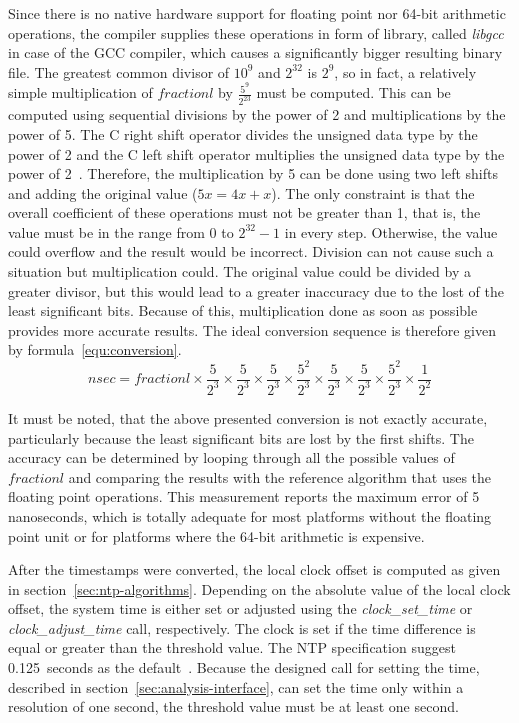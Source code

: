 Since there is no native hardware support for floating point nor 64-bit arithmetic operations,
the compiler supplies these operations in form of library, called {\it{libgcc}} in case of the GCC compiler,
which causes a significantly bigger resulting binary file.
The greatest common divisor of $10^9$ and $2^{32}$ is $2^9$,
so in fact, a relatively simple multiplication of $fractionl$ by $\frac{5^9}{2^{23}}$ must be computed.
This can be computed using sequential divisions by the power of 2 and multiplications by the power of 5.
The C right shift operator divides the unsigned data type by the power of 2
and the C left shift operator multiplies the unsigned data type by the power of 2~\cite{c99}.
Therefore, the multiplication by 5 can be done using two left shifts and
adding the original value ($5x = 4x + x$).
The only constraint is that the overall coefficient of these operations must not be greater than 1,
that is, the value must be in the range from $0$ to $2^{32}-1$ in every step.
Otherwise, the value could overflow and the result would be incorrect.
Division can not cause such a situation but multiplication could.
The original value could be divided by a greater divisor,
but this would lead to a greater inaccuracy due to the lost of the least significant bits.
Because of this, multiplication done as soon as possible provides more accurate results.
The ideal conversion sequence is therefore given by formula~\ref{equ:conversion}.
\begin{equation}
\label{equ:conversion}
nsec = fractionl \times \frac{5}{2^3} \times \frac{5}{2^3} \times \frac{5}{2^3} \times \frac{5^2}{2^3} \times \frac{5}{2^3}  \times \frac{5}{2^3} \times \frac{5^2}{2^3} \times \frac{1}{2^2}
\end{equation}

It must be noted, that the above presented conversion is not exactly accurate, particularly
because the least significant bits are lost by the first shifts. %
The accuracy can be determined by looping through all the possible values of $fractionl$ %
and comparing the results with the reference algorithm that uses the floating point operations.
This measurement reports the maximum error of 5 nanoseconds,
which is totally adequate for most platforms without the floating point unit or
for platforms where the 64-bit arithmetic is expensive.

After the timestamps were converted, the local clock offset is computed
as given in section~\ref{sec:ntp-algorithms}.
Depending on the absolute value of the local clock offset,
the system time is either set or adjusted using the {\it{clock\_set\_time}}
or {\it{clock\_adjust\_time}} call, respectively.
The clock is set if the time difference is equal or greater than
the threshold value.
The NTP specification suggest 0.125~seconds as the default~\cite{rfc5905}.
Because the designed call for setting the time, described in section~\ref{sec:analysis-interface},
can set the time only within a resolution of one second,
the threshold value must be at least one second.

